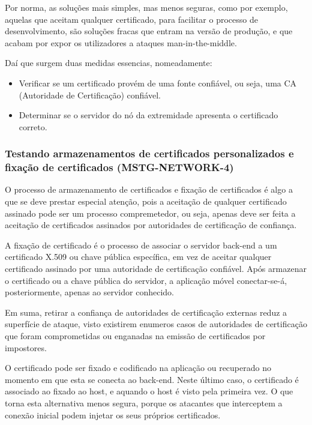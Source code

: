 \documentclass{article}
\begin{document}
\par Por norma, as soluções mais simples, mas menos seguras, como por exemplo, aquelas que aceitam qualquer certificado, para facilitar o processo de desenvolvimento, são soluções fracas que entram na versão de produção, e que acabam por expor os utilizadores a ataques man-in-the-middle.

\par Daí que surgem duas medidas essencias, nomeadamente:
\begin{itemize}
    \item Verificar se um certificado provém de uma fonte confiável, ou seja, uma CA (Autoridade de Certificação) confiável.
    \item Determinar se o servidor do nó da extremidade apresenta o certificado correto.
\end{itemize}




\subsubsection{Testando armazenamentos de certificados personalizados e fixação de certificados (MSTG-NETWORK-4)}
\par O processo de armazenamento de certificados e fixação de certificados é algo a que se deve prestar especial atenção, pois a aceitação de qualquer certificado assinado pode ser um processo compremetedor, ou seja, apenas deve ser feita a aceitação de certificados assinados por autoridades de certificação de confiança.

\par A fixação de certificado é o processo de associar o servidor back-end a um certificado X.509 ou chave pública específica, em vez de aceitar qualquer certificado assinado por uma autoridade de certificação confiável. Após armazenar o certificado ou a chave pública do servidor, a aplicação móvel conectar-se-á, posteriormente, apenas ao servidor conhecido. 

\par Em suma, retirar a confiança de autoridades de certificação externas reduz a superfície de ataque, visto existirem enumeros casos de autoridades de certificação que foram comprometidas ou enganadas na emissão de certificados por impostores.

\par O certificado pode ser fixado e codificado na aplicação ou recuperado no momento em que esta se conecta ao back-end. Neste último caso, o certificado é associado ao fixado ao host, e aquando o host é visto pela primeira vez. O que torna esta alternativa menos segura, porque os atacantes que interceptem a conexão inicial podem injetar os seus próprios certificados.
\end{document}

